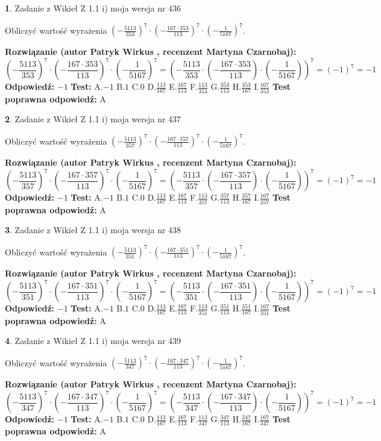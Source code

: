 \documentclass[12pt, a4paper]{article}
\theoremstyle{definition} %
\newtheorem{zad}{}
\newcommand{\zadStart}[1]{\begin{zad}#1\newline}
\newcommand{\zadStop}{\end{zad}}
\newcommand{\rozwStart}[2]{\noindent \textbf{Rozwiązanie (autor #1 , recenzent #2): }\newline}
\newcommand{\rozwStop}{\newline}
\newcommand{\odpStart}{\noindent \textbf{Odpowiedź:}\newline}
\newcommand{\odpStop}{\newline}
\newcommand{\testStart}{\noindent \textbf{Test:}\newline}
\newcommand{\testStop}{\newline}
\newcommand{\kluczStart}{\noindent \textbf{Test poprawna odpowiedź:}\newline}
\newcommand{\kluczStop}{\newline}
\begin{document}
\zadStart{Zadanie z Wikieł Z 1.1 i) moja wersja nr 436}

Obliczyć wartość wyrażenia $(-\frac{5113}{353})^{7} \cdot (-\frac{167 \cdot 353}{113})^{7} \cdot (-\frac{1}{5167})^{7}$.
\zadStop
\rozwStart{Patryk Wirkus}{Martyna Czarnobaj}
$$(-\frac{5113}{353})^{7} \cdot (-\frac{167 \cdot 353}{113})^{7} \cdot (-\frac{1}{5167})^{7} = (-\frac{5113}{353} \cdot (-\frac{167 \cdot 353}{113}) \cdot (-\frac{1}{5167}))^{7} = (-1)^{7} = -1$$
\rozwStop
\odpStart
$-1$
\odpStop
\testStart
A.$-1$ B.$1$ C.$0$ D.$\frac{113}{167}$ E.$\frac{167}{113}$
F.$\frac{113}{353}$ G.$\frac{353}{113}$
H.$\frac{353}{167}$
I.$\frac{167}{353}$
\testStop
\kluczStart
A
\kluczStop



\zadStart{Zadanie z Wikieł Z 1.1 i) moja wersja nr 437}

Obliczyć wartość wyrażenia $(-\frac{5113}{357})^{7} \cdot (-\frac{167 \cdot 357}{113})^{7} \cdot (-\frac{1}{5167})^{7}$.
\zadStop
\rozwStart{Patryk Wirkus}{Martyna Czarnobaj}
$$(-\frac{5113}{357})^{7} \cdot (-\frac{167 \cdot 357}{113})^{7} \cdot (-\frac{1}{5167})^{7} = (-\frac{5113}{357} \cdot (-\frac{167 \cdot 357}{113}) \cdot (-\frac{1}{5167}))^{7} = (-1)^{7} = -1$$
\rozwStop
\odpStart
$-1$
\odpStop
\testStart
A.$-1$ B.$1$ C.$0$ D.$\frac{113}{167}$ E.$\frac{167}{113}$
F.$\frac{113}{357}$ G.$\frac{357}{113}$
H.$\frac{357}{167}$
I.$\frac{167}{357}$
\testStop
\kluczStart
A
\kluczStop



\zadStart{Zadanie z Wikieł Z 1.1 i) moja wersja nr 438}

Obliczyć wartość wyrażenia $(-\frac{5113}{351})^{7} \cdot (-\frac{167 \cdot 351}{113})^{7} \cdot (-\frac{1}{5167})^{7}$.
\zadStop
\rozwStart{Patryk Wirkus}{Martyna Czarnobaj}
$$(-\frac{5113}{351})^{7} \cdot (-\frac{167 \cdot 351}{113})^{7} \cdot (-\frac{1}{5167})^{7} = (-\frac{5113}{351} \cdot (-\frac{167 \cdot 351}{113}) \cdot (-\frac{1}{5167}))^{7} = (-1)^{7} = -1$$
\rozwStop
\odpStart
$-1$
\odpStop
\testStart
A.$-1$ B.$1$ C.$0$ D.$\frac{113}{167}$ E.$\frac{167}{113}$
F.$\frac{113}{351}$ G.$\frac{351}{113}$
H.$\frac{351}{167}$
I.$\frac{167}{351}$
\testStop
\kluczStart
A
\kluczStop



\zadStart{Zadanie z Wikieł Z 1.1 i) moja wersja nr 439}

Obliczyć wartość wyrażenia $(-\frac{5113}{347})^{7} \cdot (-\frac{167 \cdot 347}{113})^{7} \cdot (-\frac{1}{5167})^{7}$.
\zadStop
\rozwStart{Patryk Wirkus}{Martyna Czarnobaj}
$$(-\frac{5113}{347})^{7} \cdot (-\frac{167 \cdot 347}{113})^{7} \cdot (-\frac{1}{5167})^{7} = (-\frac{5113}{347} \cdot (-\frac{167 \cdot 347}{113}) \cdot (-\frac{1}{5167}))^{7} = (-1)^{7} = -1$$
\rozwStop
\odpStart
$-1$
\odpStop
\testStart
A.$-1$ B.$1$ C.$0$ D.$\frac{113}{167}$ E.$\frac{167}{113}$
F.$\frac{113}{347}$ G.$\frac{347}{113}$
H.$\frac{347}{167}$
I.$\frac{167}{347}$
\testStop
\kluczStart
A
\kluczStop
\end{document}
